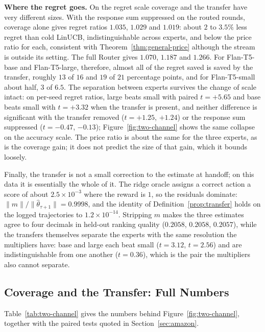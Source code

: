 \documentclass[anon]{alt2027} %
\begin{document}
\textbf{Where the regret goes.} On the regret scale coverage and the transfer
have very different sizes. With the response sum suppressed on the routed
rounds, coverage alone gives regret ratios $1.035$, $1.029$ and $1.019$:
about $2$ to $3.5\%$ less regret than cold LinUCB, indistinguishable across
experts, and below the price ratio for each, consistent with
Theorem~\ref{thm:general-price} although the stream is outside its setting.
The full Router gives $1.070$, $1.187$ and $1.266$. For Flan-T5-base and
Flan-T5-large, therefore, almost all of the regret saved is saved by the
transfer, roughly $13$ of $16$ and $19$ of $21$ percentage points, and for
Flan-T5-small about half, $3$ of $6.5$. The separation between experts
survives the change of scale intact: on per-seed regret ratios, large beats
small with paired $t=+5.65$ and base beats small with $t=+3.32$ when the
transfer is present, and neither difference is significant with the transfer
removed ($t=+1.25$, $+1.24$) or the response sum suppressed ($t=-0.47$,
$-0.13$); Figure~\ref{fig:two-channel} shows the same
collapse on the accuracy scale. The price ratio is about the same for the
three experts, as is the coverage gain; it does not predict the size of that
gain, which it bounds loosely.

Finally, the transfer is not a small correction to the estimate at handoff; on
this data it is essentially the whole of it. The ridge oracle assigns a
correct action a score of about $2.5\times10^{-3}$ where the reward is $1$, so
the residuals dominate: $\|m\|/\|\widehat\theta_{\tau+1}\|=0.9998$, and the
identity of Definition~\ref{prop:transfer} holds on the logged trajectories
to $1.2\times10^{-14}$. Stripping $m$ makes the three estimates agree to four
decimals in held-out ranking quality ($0.2058$, $0.2058$, $0.2057$), while the
transfers themselves separate the experts with the same resolution the
multipliers have: base and large each beat small ($t=3.12$, $t=2.56$) and are
indistinguishable from one another ($t=0.36$), which is the pair the
multipliers also cannot separate.

\subsection{Coverage and the Transfer: Full Numbers}
\label{app:two-channel}

Table~\ref{tab:two-channel} gives the numbers behind
Figure~\ref{fig:two-channel}, together with the paired tests quoted in
Section~\ref{sec:amazon}.
\end{document}
